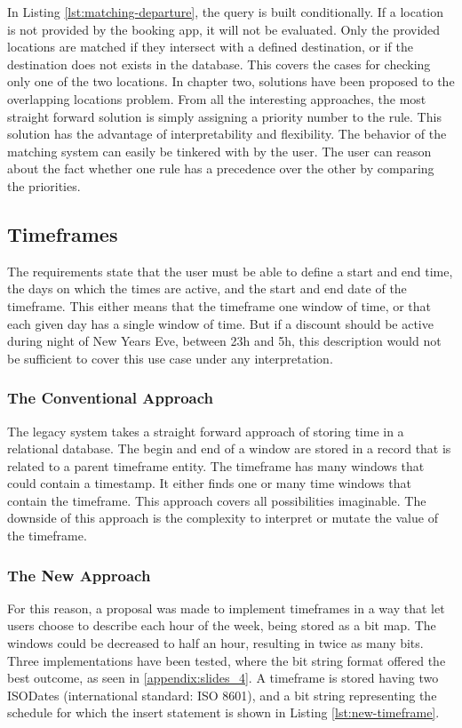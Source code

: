 In Listing \ref{lst:matching-departure}, the query is built conditionally. If a location is not provided by the booking app, it will not be evaluated. Only the provided locations are matched if they intersect with a defined destination, or if the destination does not exists in the database. This covers the cases for checking only one of the two locations. In chapter two, solutions have been proposed to the overlapping locations problem. From all the interesting approaches, the most straight forward solution is simply assigning a priority number to the rule. This solution has the advantage of interpretability and flexibility. The behavior of the matching system can easily be tinkered with by the user. The user can reason about the fact whether one rule has a precedence over the other by comparing the priorities.

\subsection{Timeframes}
The requirements state that the user must be able to define a start and end time, the days on which the times are active, and the start and end date of the timeframe. This either means that the timeframe one window of time, or that each given day has a single window of time. But if a discount should be active during night of New Years Eve, between 23h and 5h, this description would not be sufficient to cover this use case under any interpretation.

\subsubsection{The Conventional Approach}
The legacy system takes a straight forward approach of storing time in a relational database. The begin and end of a window are stored in a record that is related to a parent timeframe entity. The timeframe has many windows that could contain a timestamp. It either finds one or many time windows that contain the timeframe. This approach covers all possibilities imaginable. The downside of this approach is the complexity to interpret or mutate the value of the timeframe.

\subsubsection{The New Approach}
For this reason, a proposal was made to implement timeframes in a way that let users choose to describe each hour of the week, being stored as a bit map. The windows could be decreased to half an hour, resulting in twice as many bits. Three implementations have been tested, where the bit string format offered the best outcome, as seen in \ref{appendix:slides_4}. A timeframe is stored having two ISODates (international standard: ISO 8601), and a bit string representing the schedule for which the insert statement is shown in Listing \ref{lst:new-timeframe}.

